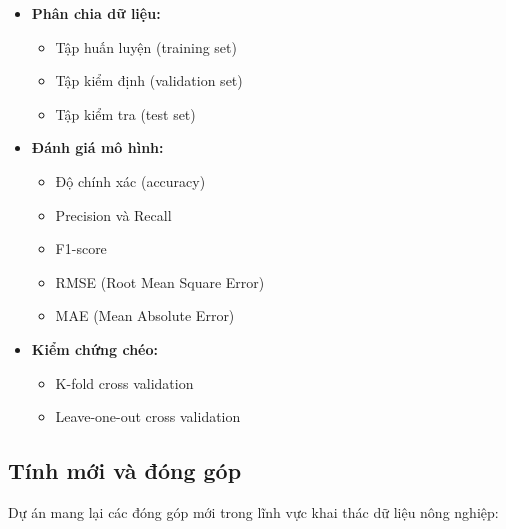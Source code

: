 \begin{itemize}
    \item \textbf{Phân chia dữ liệu:}
    \begin{itemize}
        \item Tập huấn luyện (training set)
        \item Tập kiểm định (validation set)
        \item Tập kiểm tra (test set)
    \end{itemize}
    
    \item \textbf{Đánh giá mô hình:}
    \begin{itemize}
        \item Độ chính xác (accuracy)
        \item Precision và Recall
        \item F1-score
        \item RMSE (Root Mean Square Error)
        \item MAE (Mean Absolute Error)
    \end{itemize}
    
    \item \textbf{Kiểm chứng chéo:}
    \begin{itemize}
        \item K-fold cross validation
        \item Leave-one-out cross validation
    \end{itemize}
\end{itemize}

\subsection{Tính mới và đóng góp}

\hspace{0.5cm}Dự án mang lại các đóng góp mới trong lĩnh vực khai thác dữ liệu nông nghiệp:

